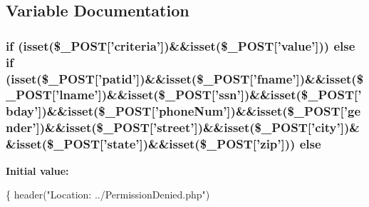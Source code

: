 \subsection{Variable Documentation}
\hypertarget{handle__edit__pat__rec_8php_ae977646182091e9d676fab7abaa34912}{
\subsubsection[{else}]{\setlength{\rightskip}{0pt plus 5cm}if (isset(\$\-\_\-\-P\-O\-S\-T\mbox{[}'criteria'\mbox{]})\&\&isset(\$\-\_\-\-P\-O\-S\-T\mbox{[}'value'\mbox{]})) else if (isset(\$\-\_\-\-P\-O\-S\-T\mbox{[}'patid'\mbox{]})\&\&isset(\$\-\_\-\-P\-O\-S\-T\mbox{[}'fname'\mbox{]})\&\&isset(\$\-\_\-\-P\-O\-S\-T\mbox{[}'lname'\mbox{]})\&\&isset(\$\-\_\-\-P\-O\-S\-T\mbox{[}'ssn'\mbox{]})\&\&isset(\$\-\_\-\-P\-O\-S\-T\mbox{[}'bday'\mbox{]})\&\&isset(\$\-\_\-\-P\-O\-S\-T\mbox{[}'phone\-Num'\mbox{]})\&\&isset(\$\-\_\-\-P\-O\-S\-T\mbox{[}'gender'\mbox{]})\&\&isset(\$\-\_\-\-P\-O\-S\-T\mbox{[}'street'\mbox{]})\&\&isset(\$\-\_\-\-P\-O\-S\-T\mbox{[}'city'\mbox{]})\&\&isset(\$\-\_\-\-P\-O\-S\-T\mbox{[}'state'\mbox{]})\&\&isset(\$\-\_\-\-P\-O\-S\-T\mbox{[}'zip'\mbox{]})) else}}\label{handle__edit__pat__rec_8php_ae977646182091e9d676fab7abaa34912}
{\bfseries Initial value\-:}
\begin{DoxyCode}
\{
    header(\textcolor{stringliteral}{"Location: ../PermissionDenied.php"})
\end{DoxyCode}
